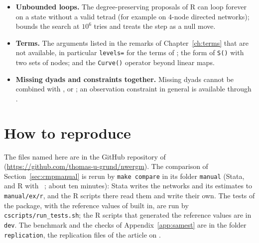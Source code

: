\begin{itemize}
  \item \textbf{Unbounded loops.} The degree-preserving proposals of R can loop forever on a state without a valid tetrad (for example on 4-node directed networks); \nwergm{} bounds the search at $10^{6}$ tries and treats the step as a null move.
  \item \textbf{Terms.} The arguments listed in the remarks of Chapter~\ref{ch:terms} that are not available, in particular \texttt{levels=} for the terms of ; the form of \texttt{S()} with two sets of nodes; and the \texttt{Curve()} operator beyond linear maps.
  \item \textbf{Missing dyads and constraints together.} Missing dyads cannot be combined with ,  or ; an observation constraint in general is available through .
\end{itemize}

\section{How to reproduce}\label{sec:reproduce}

The files named here are in the GitHub repository of \nwergm{} (\url{https://github.com/thomas-u-grund/nwergm}). The comparison of Section~\ref{sec:cmpmanual} is rerun by \texttt{make compare} in its folder \texttt{manual} (Stata, and R with \ergm{}~\ergmver{}; about ten minutes): Stata writes the networks and its estimates to \texttt{manual/ex/r}, and the R scripts there read them and write their own. The tests of the package, with the reference values of \ergm{} built in, are run by \texttt{cscripts/run\_tests.sh}; the R scripts that generated the reference values are in \texttt{dev}. The benchmark and the checks of Appendix~\ref{app:samest} are in the folder \texttt{replication}, the replication files of the article on \nwergm{}.
